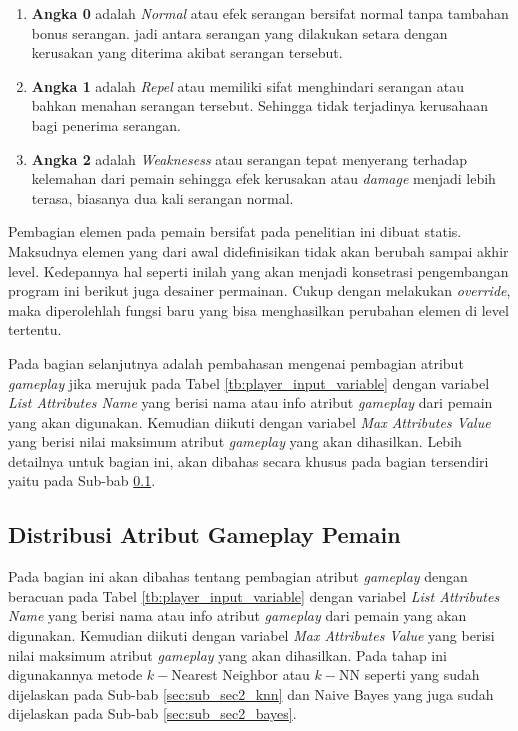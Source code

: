 \begin{enumerate}[label=\alph*).]
	\item \textbf{Angka 0} adalah \textit{Normal} atau efek serangan bersifat normal tanpa tambahan bonus serangan. jadi antara serangan yang dilakukan setara dengan kerusakan yang diterima akibat serangan tersebut.
	\item \textbf{Angka 1} adalah \textit{Repel} atau memiliki sifat menghindari serangan atau bahkan menahan serangan tersebut. Sehingga tidak terjadinya kerusahaan bagi penerima serangan.
	\item \textbf{Angka 2} adalah \textit{Weaknesess} atau serangan tepat menyerang terhadap kelemahan dari pemain sehingga efek kerusakan atau \textit{damage} menjadi lebih terasa, biasanya dua kali serangan normal. 
\end{enumerate}

Pembagian elemen pada pemain bersifat pada penelitian ini dibuat statis. Maksudnya elemen yang dari awal didefinisikan tidak akan berubah sampai akhir level. Kedepannya hal seperti inilah yang akan menjadi konsetrasi pengembangan program ini berikut juga desainer permainan. Cukup dengan melakukan \textit{override}, maka diperolehlah fungsi baru yang bisa menghasilkan perubahan elemen di level tertentu.
\vspace{1ex}

Pada bagian selanjutnya adalah pembahasan mengenai pembagian atribut \textit{gameplay} jika merujuk pada Tabel \ref{tb:player_input_variable} dengan variabel \textit{List Attributes Name} yang berisi nama atau info atribut \textit{gameplay} dari pemain yang akan digunakan. Kemudian diikuti dengan variabel \textit{Max Attributes Value} yang berisi nilai maksimum atribut \textit{gameplay} yang akan dihasilkan. Lebih detailnya untuk bagian ini, akan dibahas secara khusus pada bagian tersendiri yaitu pada Sub-bab \ref{sec:sub_sec3_stat_pemain}.
\vspace{1ex}

\subsection{Distribusi Atribut Gameplay Pemain}
\label{sec:sub_sec3_stat_pemain}
\vspace{1ex}

Pada bagian ini akan dibahas tentang pembagian atribut \textit{gameplay} dengan beracuan pada Tabel \ref{tb:player_input_variable} dengan variabel \textit{List Attributes Name} yang berisi nama atau info atribut \textit{gameplay} dari pemain yang akan digunakan. Kemudian diikuti dengan variabel \textit{Max Attributes Value} yang berisi nilai maksimum atribut \textit{gameplay} yang akan dihasilkan. Pada tahap ini digunakannya metode $k-$Nearest Neighbor atau $k-$NN seperti yang sudah dijelaskan pada Sub-bab \ref{sec:sub_sec2_knn} dan Naive Bayes yang juga sudah dijelaskan pada Sub-bab \ref{sec:sub_sec2_bayes}.
\vspace{1ex}

